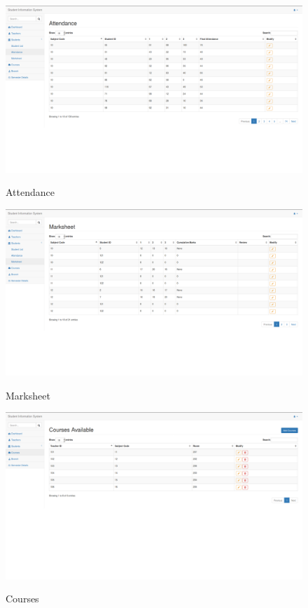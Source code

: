 \begin{figure}[H]
\centering
\caption{Attendance}
\includegraphics[width=\textwidth,height=\textheight,keepaspectratio]{./snaps/6.png}
\\[0.2in]

\end{figure}

\begin{figure}[H]
\centering
\caption{Marksheet}
\includegraphics[width=\textwidth,height=\textheight,keepaspectratio]{./snaps/7.png}
\\[0.2in]

\end{figure}

\begin{figure}[H]
\centering
\caption{Courses}
\includegraphics[width=\textwidth,height=\textheight,keepaspectratio]{./snaps/8.png}
\\[0.2in]

\end{figure}

